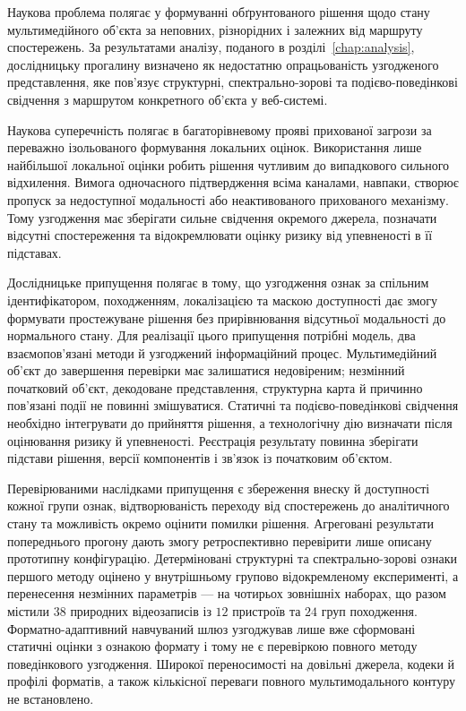 Наукова проблема полягає у формуванні обґрунтованого рішення щодо стану мультимедійного об’єкта за неповних, різнорідних і залежних від маршруту спостережень. За результатами аналізу, поданого в розділі~\ref{chap:analysis}, дослідницьку прогалину визначено як недостатню опрацьованість узгодженого представлення, яке пов’язує структурні, спектрально-зорові та подієво-поведінкові свідчення з маршрутом конкретного об’єкта у веб-системі.

Наукова суперечність полягає в багаторівневому прояві прихованої загрози за переважно ізольованого формування локальних оцінок. Використання лише найбільшої локальної оцінки робить рішення чутливим до випадкового сильного відхилення. Вимога одночасного підтвердження всіма каналами, навпаки, створює пропуск за недоступної модальності або неактивованого прихованого механізму. Тому узгодження має зберігати сильне свідчення окремого джерела, позначати відсутні спостереження та відокремлювати оцінку ризику від упевненості в її підставах.

Дослідницьке припущення полягає в тому, що узгодження ознак за спільним ідентифікатором, походженням, локалізацією та маскою доступності дає змогу формувати простежуване рішення без прирівнювання відсутньої модальності до нормального стану. Для реалізації цього припущення потрібні модель, два взаємопов’язані методи й узгоджений інформаційний процес. Мультимедійний об’єкт до завершення перевірки має залишатися недовіреним; незмінний початковий об’єкт, декодоване представлення, структурна карта й причинно пов’язані події не повинні змішуватися. Статичні та подієво-поведінкові свідчення необхідно інтегрувати до прийняття рішення, а технологічну дію визначати після оцінювання ризику й упевненості. Реєстрація результату повинна зберігати підстави рішення, версії компонентів і зв’язок із початковим об’єктом.

Перевірюваними наслідками припущення є збереження внеску й доступності кожної групи ознак, відтворюваність переходу від спостережень до аналітичного стану та можливість окремо оцінити помилки рішення. Агреговані результати попереднього прогону дають змогу ретроспективно перевірити лише описану прототипну конфігурацію. Детерміновані структурні та спектрально-зорові ознаки першого методу оцінено у внутрішньому групово відокремленому експерименті, а перенесення незмінних параметрів --- на чотирьох зовнішніх наборах, що разом містили $38$ природних відеозаписів із $12$ пристроїв та $24$ груп походження. Форматно-адаптивний навчуваний шлюз узгоджував лише вже сформовані статичні оцінки з ознакою формату і тому не є перевіркою повного методу поведінкового узгодження. Широкої переносимості на довільні джерела, кодеки й профілі форматів, а також кількісної переваги повного мультимодального контуру не встановлено.


